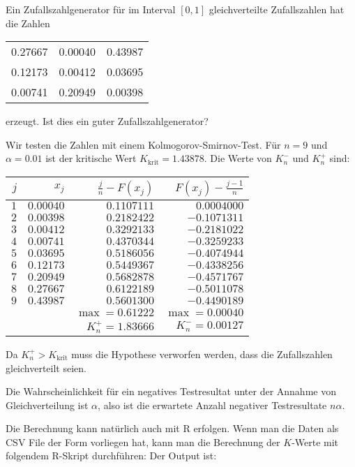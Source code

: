 Ein Zufallszahlgenerator für im Interval $[0,1]$ gleichverteilte
Zufallszahlen hat die Zahlen
\begin{center}
\begin{tabular}{ccc}
0.27667& 0.00040& 0.43987\\
0.12173& 0.00412& 0.03695\\
0.00741& 0.20949& 0.00398
\end{tabular}
\end{center}
erzeugt.
Ist dies ein guter Zufallszahlgenerator?


\begin{loesung}
Wir testen die Zahlen mit einem Kolmogorov-Smirnov-Test.
Für $n=9$ und $\alpha=0.01$ ist der kritische Wert
$K_{\text{krit}}=1.43878$. Die Werte von
$K_n^-$ und $K_n^+$ sind:
\begin{center}
\begin{tabular}{|rrrr|}
\hline
$j$&$x_j$&$\frac{j}n-F(x_j)$&$F(x_j)-\frac{j-1}n$\\
\hline
$1$&$0.00040$&$0.1107111$&$ 0.0004000$\\
$2$&$0.00398$&$0.2182422$&$-0.1071311$\\
$3$&$0.00412$&$0.3292133$&$-0.2181022$\\
$4$&$0.00741$&$0.4370344$&$-0.3259233$\\
$5$&$0.03695$&$0.5186056$&$-0.4074944$\\
$6$&$0.12173$&$0.5449367$&$-0.4338256$\\
$7$&$0.20949$&$0.5682878$&$-0.4571767$\\
$8$&$0.27667$&$0.6122189$&$-0.5011078$\\
$9$&$0.43987$&$0.5601300$&$-0.4490189$\\
\hline
&&$\operatorname{max}=0.61222$&$\operatorname{max}= 0.00040$\\
&&$K_n^+=1.83666$&$K_n^-= 0.00127$\\
\hline
\end{tabular}
\end{center}
Da $K_n^+>K_{\text{krit}}$ muss die Hypothese verworfen werden, dass
die Zufallszahlen gleichverteilt seien.
\item Die Wahrscheinlichkeit für ein negatives Testresultat unter der
Annahme von Gleichverteilung ist $\alpha$, also ist die erwartete Anzahl
negativer Testresultate $n\alpha$.

Die Berechnung kann natürlich auch mit R erfolgen. Wenn man die Daten
als CSV File der Form
vorliegen hat, kann man die Berechnung der $K$-Werte mit folgendem
R-Skript durchführen:
Der Output ist:
\end{loesung}

